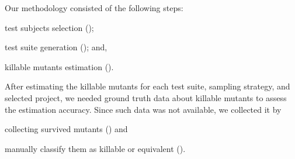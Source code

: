 \documentclass[sigconf,review,anonymous]{acmart}
\begin{document}
Our methodology consisted of the following steps:
\begin{enumerate*}[label=(\arabic*)]
    \item test subjects selection ();
    \item test suite generation ();
    and, \item killable mutants estimation ().
\end{enumerate*}
%
After estimating the killable mutants for each test suite, sampling strategy, and selected project,
we needed ground truth data about killable mutants
to assess the estimation accuracy. %
Since such data was not available, %
we collected it by 
\begin{enumerate*}[label=(\arabic*),start=4]   
     \item collecting survived mutants () and
     \item manually classify them as killable or equivalent ().
\end{enumerate*}
\end{document}
